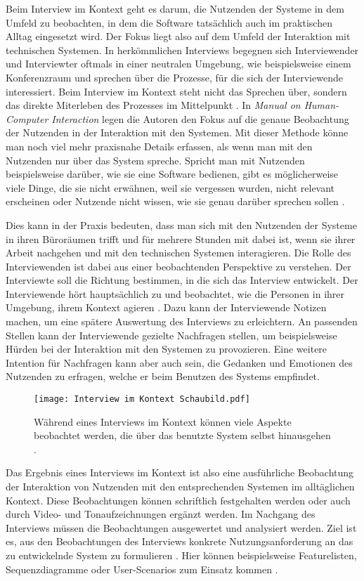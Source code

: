 Beim Interview im Kontext geht es darum, die Nutzenden der Systeme in dem
Umfeld zu beobachten, in dem die Software tatsächlich auch im praktischen
Alltag eingesetzt wird. Der Fokus liegt also auf dem Umfeld der Interaktion mit
technischen Systemen. In herkömmlichen Interviews begegnen sich Interviewender und
Interviewter oftmals in einer neutralen Umgebung, wie beispielsweise einem
Konferenzraum und sprechen über die Prozesse, für die sich der Interviewende
interessiert. Beim Interview im Kontext steht nicht das Sprechen über, sondern das direkte Miterleben des Prozesses im Mittelpunkt \cite{contextualDesign}. In \textit{Manual on Human-Computer Interaction} legen die Autoren den Fokus auf die genaue Beobachtung der
Nutzenden in der Interaktion mit den Systemen. Mit dieser Methode könne man
noch viel mehr praxisnahe Details erfassen, als wenn man mit den Nutzenden nur
über das System spreche. Spricht man mit Nutzenden beispielsweise darüber, wie
sie eine Software bedienen, gibt es möglicherweise viele Dinge, die sie nicht
erwähnen, weil sie vergessen wurden, nicht relevant erscheinen oder Nutzende
nicht wissen, wie sie genau darüber sprechen sollen \cite{hciHandbook}.

Dies kann in der Praxis bedeuten, dass man sich mit den Nutzenden der Systeme
in ihren Büroräumen trifft und für mehrere Stunden mit dabei ist, wenn sie
ihrer Arbeit nachgehen und mit den technischen Systemen interagieren. Die Rolle
des Interviewenden ist dabei aus einer beobachtenden Perspektive zu verstehen.
Der Interviewte soll die Richtung bestimmen, in die sich das Interview
entwickelt. Der Interviewende hört hauptsächlich zu und beobachtet, wie die
Personen in ihrer Umgebung, ihrem Kontext agieren \cite{hciHandbook}. Dazu kann
der Interviewende Notizen machen, um eine spätere Auswertung des Interviews zu
erleichtern. An passenden Stellen kann der Interviewende gezielte Nachfragen
stellen, um beispielsweise Hürden bei der Interaktion mit den Systemen zu
provozieren. Eine weitere Intention für Nachfragen kann aber auch sein, die
Gedanken und Emotionen des Nutzenden zu erfragen, welche er beim Benutzen des
Systems empfindet.

\begin{figure}[h]
    \caption{Während eines Interviews im Kontext können viele Aspekte beobachtet werden, die über das benutzte System selbst hinausgehen \cite{johannesGrafik}.}
    \centering
    \texttt{[image: Interview im Kontext Schaubild.pdf]}
\end{figure}

Das Ergebnis eines Interviews im Kontext ist also eine ausführliche Beobachtung
der Interaktion von Nutzenden mit den entsprechenden Systemen im alltäglichen
Kontext. Diese Beobachtungen können schriftlich festgehalten werden oder auch
durch Video- und Tonaufzeichnungen ergänzt werden. Im Nachgang des Interviews
müssen die Beobachtungen ausgewertet und analysiert werden. Ziel ist es, aus den Beobachtungen des Interviews konkrete Nutzungsanforderung an das zu
entwickelnde System zu formulieren \cite{HMI-HCD}. Hier können beispielsweise Featurelisten,
Sequenzdiagramme oder User-Scenarios zum Einsatz kommen \cite{sequenceDiagrams}.